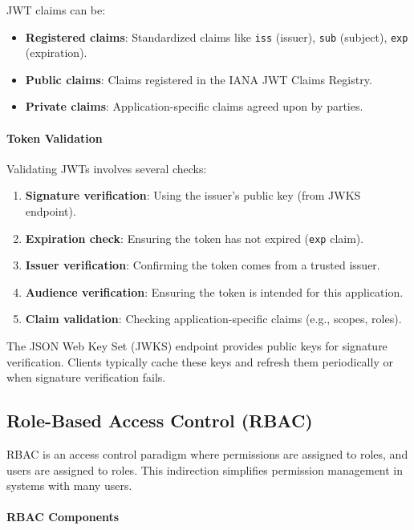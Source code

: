 JWT claims can be:
\begin{itemize}
    \item \textbf{Registered claims}: Standardized claims like \texttt{iss} (issuer), \texttt{sub} (subject), \texttt{exp} (expiration).
    \item \textbf{Public claims}: Claims registered in the IANA JWT Claims Registry.
    \item \textbf{Private claims}: Application-specific claims agreed upon by parties.
\end{itemize}

\paragraph{Token Validation}

Validating JWTs involves several checks:

\begin{enumerate}
    \item \textbf{Signature verification}: Using the issuer's public key (from JWKS endpoint).
    \item \textbf{Expiration check}: Ensuring the token has not expired (\texttt{exp} claim).
    \item \textbf{Issuer verification}: Confirming the token comes from a trusted issuer.
    \item \textbf{Audience verification}: Ensuring the token is intended for this application.
    \item \textbf{Claim validation}: Checking application-specific claims (e.g., scopes, roles).
\end{enumerate}

The JSON Web Key Set (JWKS) endpoint provides public keys for signature verification. Clients typically cache these keys and refresh them periodically or when signature verification fails.

\subsection{Role-Based Access Control (RBAC)}

RBAC is an access control paradigm where permissions are assigned to roles, and users are assigned to roles. This indirection simplifies permission management in systems with many users.

\paragraph{RBAC Components}


